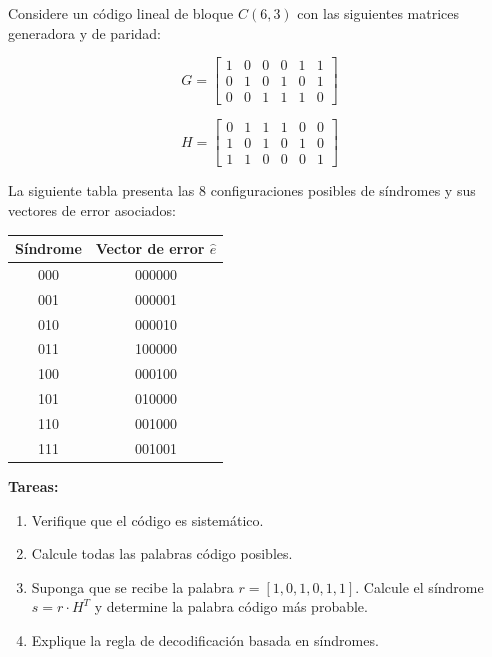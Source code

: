 \documentclass[10pt,a4paper]{article}
\begin{document}
\begin{ejercicio}
Considere un código lineal de bloque $C(6, 3)$ con las siguientes matrices generadora y de paridad:

\[
G = \begin{bmatrix}
1 & 0 & 0 & 0 & 1 & 1 \\
0 & 1 & 0 & 1 & 0 & 1 \\
0 & 0 & 1 & 1 & 1 & 0
\end{bmatrix}
\]

\[
H = \begin{bmatrix}
0 & 1 & 1 & 1 & 0 & 0 \\
1 & 0 & 1 & 0 & 1 & 0 \\
1 & 1 & 0 & 0 & 0 & 1
\end{bmatrix}
\]

La siguiente tabla presenta las 8 configuraciones posibles de síndromes y sus vectores de error asociados:

\begin{center}
\begin{tabular}{|c|c|}
\hline
Síndrome & Vector de error $\hat{e}$ \\
\hline
000 & 000000 \\
001 & 000001 \\
010 & 000010 \\
011 & 100000 \\
100 & 000100 \\
101 & 010000 \\
110 & 001000 \\
111 & 001001 \\
\hline
\end{tabular}
\end{center}

\textbf{Tareas:}
\begin{enumerate}
\item Verifique que el código es sistemático.
\item Calcule todas las palabras código posibles.
\item Suponga que se recibe la palabra $r = [1, 0, 1, 0, 1, 1]$. Calcule el síndrome $s = r \cdot H^T$ y determine la palabra código más probable.
\item Explique la regla de decodificación basada en síndromes.
\end{enumerate}
\end{ejercicio}
\end{document}

